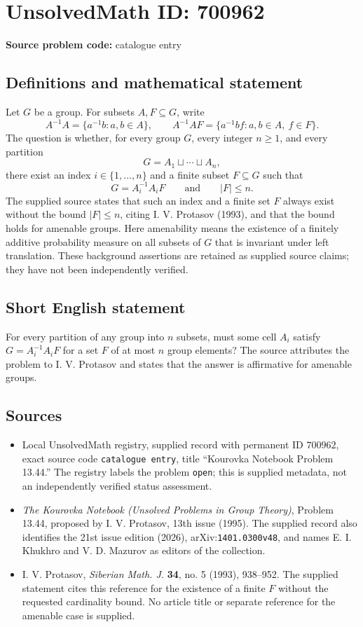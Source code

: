 \documentclass[11pt]{article}
\begin{document}
\section*{UnsolvedMath ID: 700962}
\textbf{Source problem code:} catalogue entry
\subsection{Definitions and mathematical statement}
Let \(G\) be a group. For subsets \(A,F\subseteq G\), write
\[
A^{-1}A=\{a^{-1}b:a,b\in A\},\qquad A^{-1}AF=\{a^{-1}bf:a,b\in A,\ f\in F\}.
\]
The question is whether, for every group \(G\), every integer \(n\geq 1\), and every partition
\[
G=A_1\sqcup\cdots\sqcup A_n,
\]
there exist an index \(i\in\{1,\ldots,n\}\) and a finite subset \(F\subseteq G\) such that
\[
G=A_i^{-1}A_iF\qquad\text{and}\qquad |F|\leq n.
\]
The supplied source states that such an index and a finite set \(F\) always exist without the bound \(|F|\leq n\), citing I. V. Protasov (1993), and that the bound holds for amenable groups. Here amenability means the existence of a finitely additive probability measure on all subsets of \(G\) that is invariant under left translation. These background assertions are retained as supplied source claims; they have not been independently verified.
\subsection{Short English statement}
For every partition of any group into \(n\) subsets, must some cell \(A_i\) satisfy \(G=A_i^{-1}A_iF\) for a set \(F\) of at most \(n\) group elements? The source attributes the problem to I. V. Protasov and states that the answer is affirmative for amenable groups.
\subsection{Sources}
\begin{itemize}
\item Local UnsolvedMath registry, supplied record with permanent ID \(700962\), exact source code \texttt{catalogue entry}, title ``Kourovka Notebook Problem 13.44.'' The registry labels the problem \texttt{open}; this is supplied metadata, not an independently verified status assessment.
\item \emph{The Kourovka Notebook (Unsolved Problems in Group Theory)}, Problem 13.44, proposed by I. V. Protasov, 13th issue (1995). The supplied record also identifies the 21st issue edition (2026), arXiv:\texttt{1401.0300v48}, and names E. I. Khukhro and V. D. Mazurov as editors of the collection.
\item I. V. Protasov, \emph{Siberian Math. J.} \textbf{34}, no. 5 (1993), 938--952. The supplied statement cites this reference for the existence of a finite \(F\) without the requested cardinality bound. No article title or separate reference for the amenable case is supplied.
\end{itemize}
\end{document}
